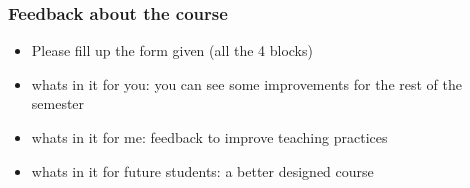\documentclass{beamer}
\begin{document}
\begin{frame}
\frametitle{Feedback about the course}
\begin{itemize}
\item Please fill up the form given (all the 4 blocks)
\item whats in it for you: you can see some improvements for the rest of the semester
\item whats in it for me: feedback to improve teaching practices
\item whats in it for future students: a better designed course
\end{itemize}
\end{frame}
\end{document}
